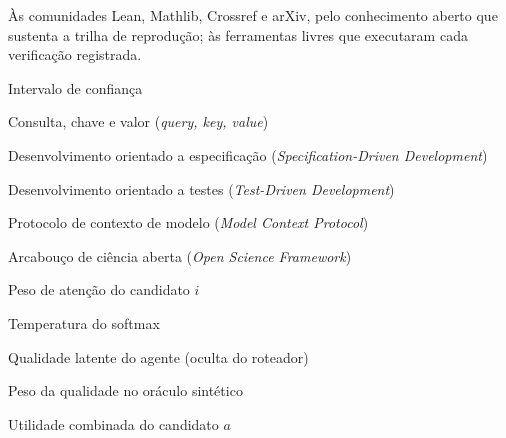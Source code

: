 \documentclass[12pt,openany,oneside,a4paper,brazil]{abntex2}
\begin{document}
\begin{agradecimentos}
Às comunidades Lean, Mathlib, Crossref e arXiv, pelo conhecimento aberto que sustenta a trilha de reprodução; às ferramentas livres que executaram cada verificação registrada.
\end{agradecimentos}
\begin{siglas}
\item[IC] Intervalo de confiança
\item[Q/K/V] Consulta, chave e valor (\textit{query, key, value})
\item[SDD] Desenvolvimento orientado a especificação (\textit{Specification-Driven Development})
\item[TDD] Desenvolvimento orientado a testes (\textit{Test-Driven Development})
\item[MCP] Protocolo de contexto de modelo (\textit{Model Context Protocol})
\item[OSF] Arcabouço de ciência aberta (\textit{Open Science Framework})
\end{siglas}
\begin{simbolos}
\item[$w_i$] Peso de atenção do candidato $i$
\item[$\tau$] Temperatura do softmax
\item[$q$] Qualidade latente do agente (oculta do roteador)
\item[$q_w$] Peso da qualidade no oráculo sintético
\item[$u(a)$] Utilidade combinada do candidato $a$
\end{simbolos}
\tableofcontents*
\listoftables*
\cleardoublepage
\textual








\end{document}
